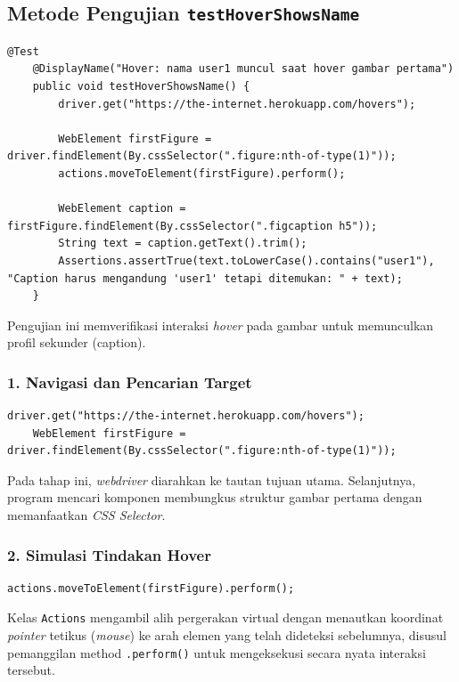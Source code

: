 \documentclass[a4paper,oneside,12pt]{report}
\begin{document}
\subsection{Metode Pengujian \texttt{testHoverShowsName}}
\begin{lstlisting}[style=javastyle, caption=Metode Utuh \texttt{testHoverShowsName}]
    @Test
    @DisplayName("Hover: nama user1 muncul saat hover gambar pertama")
    public void testHoverShowsName() {
        driver.get("https://the-internet.herokuapp.com/hovers");

        WebElement firstFigure = driver.findElement(By.cssSelector(".figure:nth-of-type(1)"));
        actions.moveToElement(firstFigure).perform();

        WebElement caption = firstFigure.findElement(By.cssSelector(".figcaption h5"));
        String text = caption.getText().trim();
        Assertions.assertTrue(text.toLowerCase().contains("user1"), "Caption harus mengandung 'user1' tetapi ditemukan: " + text);
    }
\end{lstlisting}
Pengujian ini memverifikasi interaksi \textit{hover} pada gambar untuk memunculkan profil sekunder (caption).

\subsubsection*{1. Navigasi dan Pencarian Target}
\begin{lstlisting}[style=javastyle]
    driver.get("https://the-internet.herokuapp.com/hovers");
    WebElement firstFigure = driver.findElement(By.cssSelector(".figure:nth-of-type(1)"));
\end{lstlisting}
Pada tahap ini, \textit{webdriver} diarahkan ke tautan tujuan utama. Selanjutnya, program mencari komponen membungkus struktur gambar pertama dengan memanfaatkan \textit{CSS Selector}.

\subsubsection*{2. Simulasi Tindakan Hover}
\begin{lstlisting}[style=javastyle]
    actions.moveToElement(firstFigure).perform();
\end{lstlisting}
Kelas \texttt{Actions} mengambil alih pergerakan virtual dengan menautkan koordinat \textit{pointer} tetikus (\textit{mouse}) ke arah elemen yang telah dideteksi sebelumnya, disusul pemanggilan method \texttt{.perform()} untuk mengeksekusi secara nyata interaksi tersebut.
\end{document}
